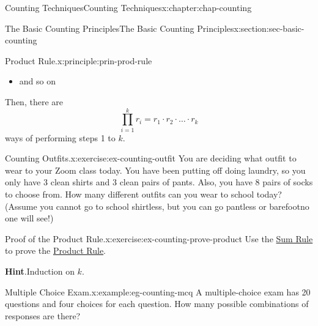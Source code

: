 \documentclass[oneside,10pt,]{book}
\newcommand{\blocktitlefont}{\relax}
\numberwithin{equation}{section}
\begin{document}
\begin{chapterptx}{Counting Techniques}{}{Counting Techniques}{}{}{x:chapter:chap-counting}
\begin{sectionptx}{The Basic Counting Principles}{}{The Basic Counting Principles}{}{}{x:section:sec-basic-counting}
\begin{principle}{Product Rule.}{}{x:principle:prin-prod-rule}
\begin{itemize}[label=\textbullet]
\item{}and so on\textellipsis{}%
\end{itemize}
Then, there are%
\begin{equation*}
\prod_{i=1}^k r_i = r_1 \cdot r_2 \cdot \ldots \cdot r_k
\end{equation*}
ways of performing steps 1 to \(k\).%
\end{principle}
\begin{inlineexercise}{Counting Outfits.}{x:exercise:ex-counting-outfit}%
You are deciding what outfit to wear to your Zoom class today. You have been putting off doing laundry, so you only have 3 clean shirts and 3 clean pairs of pants. Also, you have 8 pairs of socks to choose from. How many different outfits can you wear to school today? (Assume you cannot go to school shirtless, but you can go pantless or barefoot\textemdash{}no one will see!)%
\end{inlineexercise}
\begin{inlineexercise}{Proof of the Product Rule.}{x:exercise:ex-counting-prove-product}%
Use the \hyperref[x:principle:prin-sum-rule]{Sum Rule} to prove the \hyperref[x:principle:prin-prod-rule]{Product Rule}.%
\par\smallskip%
\noindent\textbf{\blocktitlefont Hint}.\hypertarget{g:hint:id441739}{}\quad{}Induction on \(k\).%
\end{inlineexercise}
\begin{example}{Multiple Choice Exam.}{x:example:eg-counting-mcq}%
A multiple-choice exam has 20 questions and four choices for each question. How many possible combinations of responses are there?%
\begin{sidebyside}{1}{0.35}{0.35}{0}%
\begin{sbspanel}{0.3}%

\end{sbspanel}
\end{sidebyside}
\end{example}
\end{sectionptx}
\end{chapterptx}
\end{document}
